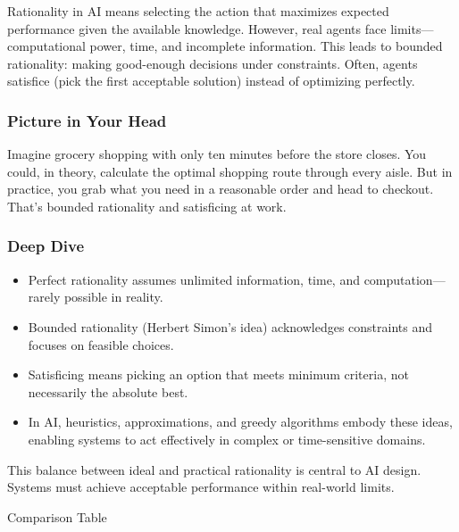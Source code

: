 \documentclass[
  letterpaper,
  DIV=11,
  numbers=noendperiod]{scrreprt}
\providecommand{\tightlist}{%
  \setlength{\itemsep}{0pt}\setlength{\parskip}{0pt}}
\begin{document}
Rationality in AI means selecting the action that maximizes expected
performance given the available knowledge. However, real agents face
limits---computational power, time, and incomplete information. This
leads to bounded rationality: making good-enough decisions under
constraints. Often, agents satisfice (pick the first acceptable
solution) instead of optimizing perfectly.

\subsubsection{Picture in Your Head}\label{picture-in-your-head-4}

Imagine grocery shopping with only ten minutes before the store closes.
You could, in theory, calculate the optimal shopping route through every
aisle. But in practice, you grab what you need in a reasonable order and
head to checkout. That's bounded rationality and satisficing at work.

\subsubsection{Deep Dive}\label{deep-dive-4}

\begin{itemize}
\tightlist
\item
  Perfect rationality assumes unlimited information, time, and
  computation---rarely possible in reality.
\item
  Bounded rationality (Herbert Simon's idea) acknowledges constraints
  and focuses on feasible choices.
\item
  Satisficing means picking an option that meets minimum criteria, not
  necessarily the absolute best.
\item
  In AI, heuristics, approximations, and greedy algorithms embody these
  ideas, enabling systems to act effectively in complex or
  time-sensitive domains.
\end{itemize}

This balance between ideal and practical rationality is central to AI
design. Systems must achieve acceptable performance within real-world
limits.

Comparison Table
\end{document}
